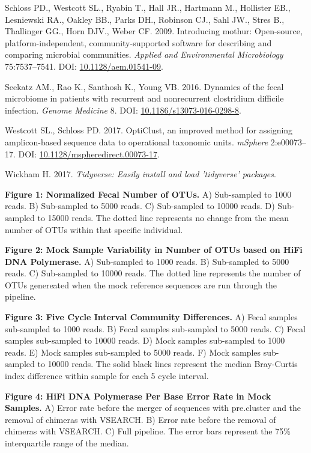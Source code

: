 \documentclass[12pt,]{article}
\begin{document}
\hypertarget{ref-mothur_schloss_2009}{}
Schloss PD., Westcott SL., Ryabin T., Hall JR., Hartmann M., Hollister
EB., Lesniewski RA., Oakley BB., Parks DH., Robinson CJ., Sahl JW.,
Stres B., Thallinger GG., Horn DJV., Weber CF. 2009. Introducing mothur:
Open-source, platform-independent, community-supported software for
describing and comparing microbial communities. \emph{Applied and
Environmental Microbiology} 75:7537--7541. DOI:
\href{https://doi.org/10.1128/aem.01541-09}{10.1128/aem.01541-09}.

\hypertarget{ref-erin_seekatz_2016}{}
Seekatz AM., Rao K., Santhosh K., Young VB. 2016. Dynamics of the fecal
microbiome in patients with recurrent and nonrecurrent clostridium
difficile infection. \emph{Genome Medicine} 8. DOI:
\href{https://doi.org/10.1186/s13073-016-0298-8}{10.1186/s13073-016-0298-8}.

\hypertarget{ref-opticlust_Westcott_2017}{}
Westcott SL., Schloss PD. 2017. OptiClust, an improved method for
assigning amplicon-based sequence data to operational taxonomic units.
\emph{mSphere} 2:e00073--17. DOI:
\href{https://doi.org/10.1128/mspheredirect.00073-17}{10.1128/mspheredirect.00073-17}.

\hypertarget{ref-tidyverse_2017}{}
Wickham H. 2017. \emph{Tidyverse: Easily install and load 'tidyverse'
packages}.

\newpage

\textbf{Figure 1: Normalized Fecal Number of OTUs.} A) Sub-sampled to
1000 reads. B) Sub-sampled to 5000 reads. C) Sub-sampled to 10000 reads.
D) Sub-sampled to 15000 reads. The dotted line represents no change from
the mean number of OTUs within that specific individual.

\textbf{Figure 2: Mock Sample Variability in Number of OTUs based on
HiFi DNA Polymerase.} A) Sub-sampled to 1000 reads. B) Sub-sampled to
5000 reads. C) Sub-sampled to 10000 reads. The dotted line represents
the number of OTUs genereated when the mock reference sequences are run
through the pipeline.

\textbf{Figure 3: Five Cycle Interval Community Differences.} A) Fecal
samples sub-sampled to 1000 reads. B) Fecal samples sub-sampled to 5000
reads. C) Fecal samples sub-sampled to 10000 reads. D) Mock samples
sub-sampled to 1000 reads. E) Mock samples sub-sampled to 5000 reads. F)
Mock samples sub-sampled to 10000 reads. The solid black lines represent
the median Bray-Curtis index difference within sample for each 5 cycle
interval.

\textbf{Figure 4: HiFi DNA Polymerase Per Base Error Rate in Mock
Samples.} A) Error rate before the merger of sequences with pre.cluster
and the removal of chimeras with VSEARCH. B) Error rate before the
removal of chimeras with VSEARCH. C) Full pipeline. The error bars
represent the 75\% interquartile range of the median.
\end{document}
